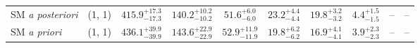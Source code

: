 \begin{table}[h!]
{\begin{tabular}{lccccccccc}
	SM {\it a posteriori} & (1, 1)       & $415.9^{+ 17.3 }_{- 17.3 }$     & $140.2^{+ 10.2 }_{- 10.2 }$    & $51.6^{+ 6.0 }_{- 6.0 }$       & $23.2^{+ 4.4 }_{- 4.4 }$    & $19.8^{+ 3.2 }_{- 3.2 }$    & $4.4^{+ 1.5 }_{- 1.5 }$     & --                         & --           \\[0.5ex] 
	SM {\it a priori}     & (1, 1)       & $436.1^{+ 39.9 }_{- 39.9 }$     & $143.6^{+ 22.9 }_{- 22.9 }$    & $52.9^{+ 11.9 }_{- 11.9 }$     & $19.8^{+ 6.2 }_{- 6.2 }$    & $16.9^{+ 4.1 }_{- 4.1 }$    & $3.9^{+ 2.3 }_{- 2.3 }$     & --                         & --           \\[0.5ex] 
	\hline
	\hline
\end{tabular}}
\end{table}
